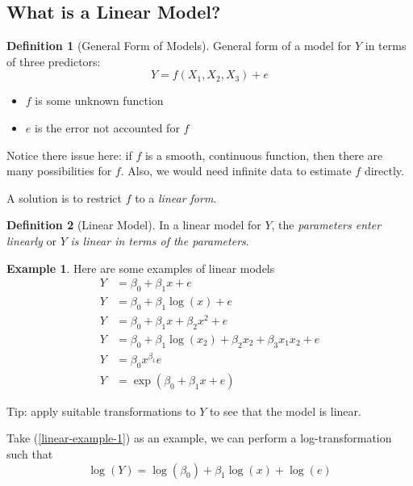 \documentclass[11pt]{article}
\theoremstyle{definition}
\newtheorem{definition}{Definition}[section]
\newtheorem{example}{Example}[section]
\numberwithin{equation}{section}
\begin{document}
\subsection{What is a Linear Model?}

\begin{definition}[General Form of Models]
  General form of a model for $Y$ in terms of three predictors:
  \begin{equation}
    Y = f(X_1, X_2, X_3) + e
  \end{equation}
  \begin{itemize}
    \item $f$ is some unknown function
    \item $e$ is the error not accounted for $f$
  \end{itemize}
\end{definition}
  \begin{writenotes}
    Notice there issue here: if $f$ is a smooth, continuous function, then there are many possibilities for $f$. Also, we would need infinite data to estimate $f$ directly.

    A solution is to restrict $f$ to a \textit{linear form}.
  \end{writenotes}

\begin{definition}[Linear Model]
  In a linear model for $Y$, the \textit{parameters enter linearly} or $Y$ \textit{is linear in terms of the parameters}.
\end{definition}

\begin{example}
Here are some examples of linear models
\begin{align}
  Y &= \beta_0 + \beta_1 x + e\\
  Y &= \beta_0 + \beta_1\log(x) + e\\
  Y &= \beta_0 + \beta_1 x + \beta_2 x^2 + e\\
  Y &= \beta_0 + \beta_1\log(x_2) + \beta_2 x_2 + \beta_3 x_1 x_2 + e\\
  Y &= \beta_0 x^{\beta_1}e\label{linear-example-1}\\
  Y &= \exp(\beta_0 + \beta_1x + e)
\end{align}

\end{example}
\begin{writenotes}
  Tip: apply suitable transformations to $Y$ to see that the model is linear.

  Take (\ref{linear-example-1}) as an example, we can perform a log-transformation such that
  \begin{equation}
     \log(Y) = \log(\beta_0) + \beta_1\log(x) + \log(e)
  \end{equation}
\end{writenotes}
\end{document}
